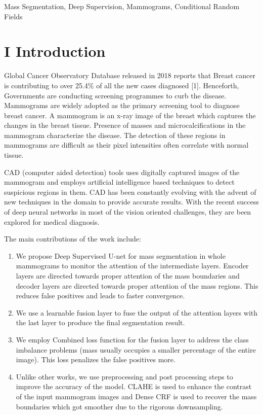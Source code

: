 \documentclass[review]{elsarticle}
\newcommand{\<}{${<}$}
\begin{document}
\begin{frontmatter}
\begin{keyword}
 Mass Segmentation, Deep Supervision, Mammograms, Conditional Random Fields
\end{keyword}

\end{frontmatter}


\section{I Introduction }

Global Cancer Observatory Database released in 2018 reports that Breast cancer is contributing to over 25.4\% of all the new cases diagnosed \citep{}[1].  Henceforth, Governments are conducting screening programmes to curb the disease. Mammograms are widely adopted as  the primary screening tool to diagnose breast cancer. A mammogram is an x-ray image of the breast which captures the changes in the breast tissue. Presence of masses and microcalcifications in the mammogram characterize the disease. The detection of these regions in mammograms are difficult as their pixel intensities often correlate with normal tissue. 

CAD (computer aided detection) tools uses digitally captured images of the mammogram and employs artificial intelligence based techniques to detect suspicious regions in them. CAD has been constantly evolving with the advent of new techniques in the domain to provide accurate results. With the recent success of deep neural networks in most of the vision oriented challenges, they are been explored for medical diagnosis. 

The main contributions of the work include:
\begin{enumerate}
   \item We propose Deep Supervised U-net for mass segmentation in whole mammograms to monitor the attention of the intermediate layers.  Encoder layers are directed towards proper attention of the mass boundaries and decoder layers are directed towards proper attention of the mass regions. This reduces false positives and leads to faster convergence.
   \item We use a learnable fusion layer to fuse the output of the attention layers with the last layer to produce the final segmentation result.
   \item We employ Combined loss function for the fusion layer to address the class imbalance problems (mass usually occupies a smaller percentage of the entire image). This loss penalizes the false positives more.
     \item Unlike other works, we use preprocessing and post processing steps to improve the accuracy of the model. CLAHE is used to enhance the contrast of the input mammogram images and Dense CRF is used to recover the mass boundaries which got smoother due to the rigorous downsampling.
\end{enumerate}
\end{document}
